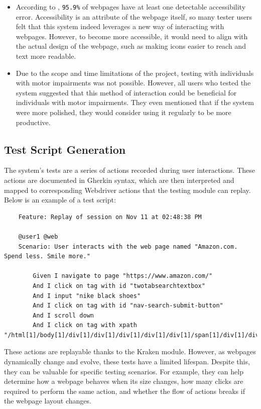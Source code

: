 \begin{itemize}
    \item According to \cite{techreport:webaim-2024}, \verb|95.9%| of webpages have at least one detectable accessibility error. Accessibility is an attribute of the webpage itself, so many tester users felt that this system indeed leverages a new way of interacting with webpages. However, to become more accessible, it would need to align with the actual design of the webpage, such as making icons easier to reach and text more readable.
    \item Due to the scope and time limitations of the project, testing with individuals with motor impairments was not possible. However, all users who tested the system suggested that this method of interaction could be beneficial for individuals with motor impairments. They even mentioned that if the system were more polished, they would consider using it regularly to be more productive.
\end{itemize}


\subsection{Test Script Generation}

The system's tests are a series of actions recorded during user interactions. These actions are documented in Gherkin syntax, which are then interpreted and mapped to corresponding Webdriver actions that the testing module can replay. Below is an example of a test script:

\begin{lstlisting}
    Feature: Replay of session on Nov 11 at 02:48:38 PM

    @user1 @web
    Scenario: User interacts with the web page named "Amazon.com. Spend less. Smile more."
    
        Given I navigate to page "https://www.amazon.com/"
        And I click on tag with id "twotabsearchtextbox"
        And I input "nike black shoes"
        And I click on tag with id "nav-search-submit-button"
        And I scroll down
        And I click on tag with xpath "/html[1]/body[1]/div[1]/div[1]/div[1]/div[1]/div[1]/span[1]/div[1]/div[9]/div[1]/div[1]/span[1]/div[1]/div[1]/div[1]/span[1]/a[1]/div[1]"
\end{lstlisting}

These actions are replayable thanks to the Kraken module. However, as webpages dynamically change and evolve, these tests have a limited lifespan. Despite this, they can be valuable for specific testing scenarios. For example, they can help determine how a webpage behaves when its size changes, how many clicks are required to perform the same action, and whether the flow of actions breaks if the webpage layout changes.
